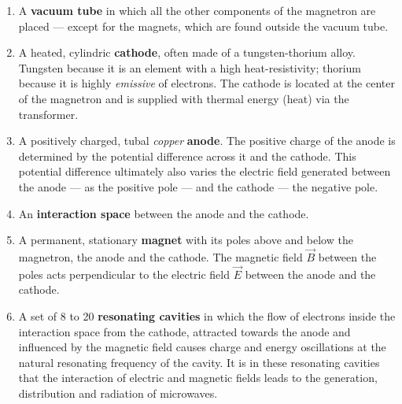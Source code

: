 \begin{enumerate}

	\item A \textbf{vacuum tube} in which all the other components of the magnetron are placed --- except for the magnets, which are found outside the vacuum tube.

	\item A heated, cylindric \textbf{cathode}, often made of a tungsten-thorium alloy. Tungsten because it is an element with a high heat-resistivity; thorium because it is highly \emph{emissive} of electrons. The cathode is located at the center of the magnetron and is supplied with thermal energy (heat) via the transformer.

	\item A positively charged, tubal \emph{copper} \textbf{anode}. The positive charge of the anode is determined by the potential difference across it and the cathode. This potential difference ultimately also varies the electric field generated between the anode --- as the positive pole --- and the cathode --- the negative pole.

	\item An \textbf{interaction space} between the anode and the cathode.

	\item A permanent, stationary \textbf{magnet} with its poles above and below the magnetron, the anode and the cathode. The magnetic field $\vec{B}$ between the poles acts perpendicular to the electric field $\vec{E}$ between the anode and the cathode.

	\item A set of 8 to 20 \textbf{resonating cavities} in which the flow of electrons inside the interaction space from the cathode, attracted towards the anode and influenced by the magnetic field causes charge and energy oscillations at the natural resonating frequency of the cavity. It is in these resonating cavities that the interaction of electric and magnetic fields leads to the generation, distribution and radiation of microwaves.

\end{enumerate}

